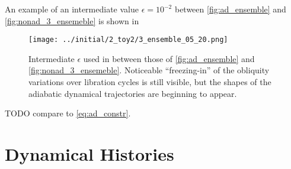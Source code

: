 \documentclass[
        fleqn,
        usenatbib,
    ]{mnras}
\begin{document}
An example of an intermediate value $\epsilon = 10^{-2}$ between
\autoref{fig:ad_ensemble} and \autoref{fig:nonad_3_ensemeble} is shown in
\begin{figure}
    \centering
    \texttt{[image: ../initial/2\_toy2/3\_ensemble\_05\_20.png]}
    \caption{Intermediate $\epsilon$ used in between those of
    \autoref{fig:ad_ensemble} and \autoref{fig:nonad_3_ensemeble}. Noticeable
    ``freezing-in'' of the obliquity variations over libration cycles is still
    visible, but the shapes of the adiabatic dynamical trajectories are
    beginning to appear.}\label{fig:nonad_3_ensemble_20}
\end{figure}

TODO compare to \autoref{eq:ad_constr}.




\appendix

\section{Dynamical Histories}\label{s:app_histories}
\end{document}
